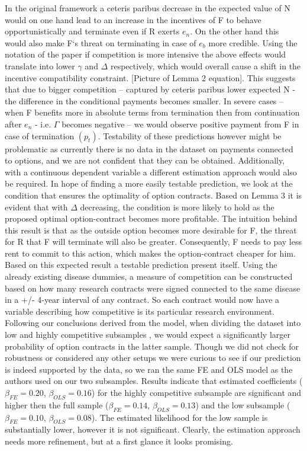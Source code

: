 In the original framework a ceteris paribus  decrease in the expected value of N would on one hand lead to an increase in the incentives of F to behave opportunistically and terminate even if R exerts $e_n$.  On the other hand this would also make F`s threat on terminating in case of $e_b$ more credible. Using the notation of the paper if competition is more intensive the above effects would translate into lower $\gamma$ and $\Delta$ respectively, which would overall cause a shift in the incentive compatibility constraint. [Picture of Lemma 2 equation]. This suggests that due to bigger competition -- captured by ceteris paribus lower expected N - the difference in the conditional payments becomes smaller. In severe cases -- when F benefits more in absolute terms from termination then from continuation after $e_n$ - i.e. $\Gamma$ becomes negative -- we would observe positive payment from F in case of termination $(p_t)$. Testability of these predictions however might be problematic as currently there is no data in the dataset on payments connected to options, and we are not confident that they can be obtained. Additionally, with a continuous dependent variable a different estimation approach would also be required.
In hope of finding a more easily testable prediction, we look at the condition that ensures the optimality of option contracts. Based on Lemma 3 it is evident that with $\Delta$ decreasing, the condition is more likely to hold as the proposed optimal option-contract becomes more profitable. The intuition behind this result is that as the outside option becomes more desirable for F, the threat for R that F will terminate will also be greater. Consequently, F needs to pay less rent to commit to this action, which makes the option-contract cheaper for him.
Based on this expected result a testable prediction present itself. Using the already existing disease dummies, a measure of competition can be constructed based on how many research contracts were signed connected to the same disease in a +/- 4-year interval   of any contract. So each contract would now have a variable describing how competitive is its particular research environment. Following our conclusions derived from the model, when dividing the dataset into low and highly competitive subsamples , we would expect a significantly larger probability of option contracts in the latter sample. Though we did not check for robustness or considered any other setups we were curious to see if our prediction is indeed supported by the data, so we ran the same FE and OLS model as the authors used on our two subsamples. Results indicate that estimated coefficients ($\beta_{FE}=0.20$, $\beta_{OLS}=0.16$) for the highly competitive subsample are significant and higher then the full sample ($\beta_{FE}=0.14$, $\beta_{OLS}=0.13$) and the low subsample ($\beta_{FE}=0.10$, $\beta_{OLS}=0.08$). The estimated likelihood for the low sample is substantially lower, however it is not significant. Clearly, the estimation approach needs more refinement, but at a first glance it looks promising.
